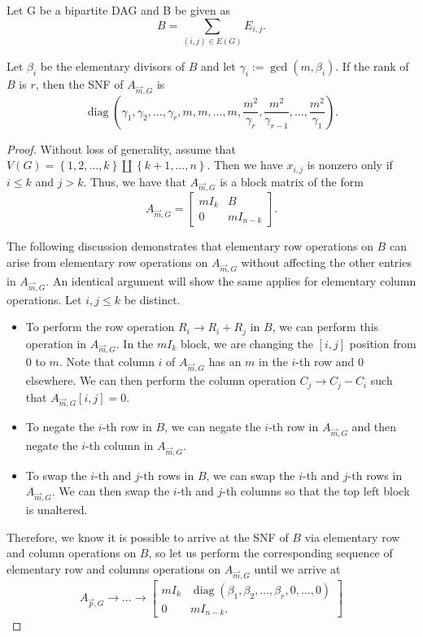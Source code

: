 \documentclass[10pt,a4paper]{amsart}
\DeclareMathOperator{\diag}{diag}
\newcommand\set[1]{\left\{#1\right\}}
\begin{document}
\begin{prop}\label{thm:bipartite_elementary_divisors}
	Let G be a bipartite DAG and B be given as 
	\[
	B = \sum_{(i,j)\in E(G)} E_{i,j}. 
	\]
	
	Let $\beta_i$ be the elementary divisors of $B$ and let $\gamma_i := \gcd(m, \beta_i)$. 
	If the rank of $B$ is $r$, then the SNF of $A_{\vec{m}, G}$ is
	\[\diag\left(\gamma_1, \gamma_2, \dots, \gamma_r, m, m, \dots, m, \dfrac{m^2}{\gamma_r}, \dfrac{m^2}{\gamma_{r-1}}, \dots, \dfrac{m^2}{\gamma_{1}}\right).\]
\end{prop}

\begin{proof}
	Without loss of generality, assume that $V(G) = \set{1,2,\dots,k} \amalg \set{k+1,\dots,n}$. 
	Then we have $x_{i,j}$ is nonzero only if $i \leq k$ and $j > k$. Thus, we have that $A_{\vec{m}, G}$ is a block matrix of the form
	\[A_{\vec{m}, G} = \begin{bmatrix}
		mI_k & B \\
		0 & mI_{n-k}
	\end{bmatrix}.\]
	
	The following discussion demonstrates that elementary row operations on $B$ can arise from elementary row operations on $A_{\vec{m} ,G}$ without affecting the other entries in $A_{\vec{m} ,G}$. 
	An identical argument will show the same applies for elementary column operations. 
	Let $i,j \leq k$ be distinct.
	\begin{itemize}
		\item To perform the row operation $R_i \to R_i + R_j$ in $B$, we can perform this operation in $A_{\vec{m}, G}$. In the $mI_k$ block, we are changing the $[i,j]$ position from 0 to $m$. 
		Note that column $i$ of $A_{\vec{m}, G}$ has an $m$ in the $i$-th row and 0 elsewhere. 
		We can then perform the column operation $C_j \to C_j - C_i$ such that $A_{\vec{m}, G}[i,j] = 0$. 
		\item To negate the $i$-th row in $B$, we can negate the $i$-th row in $A_{\vec{m}, G}$ and then negate the $i$-th column in $A_{\vec{m}, G}$.
		\item To swap the $i$-th and $j$-th rows in $B$, we can swap the $i$-th and $j$-th rows in $A_{\vec{m}, G}$. We can then swap the $i$-th and $j$-th columns so that the top left block is unaltered.
	\end{itemize}
	
	Therefore, we know it is possible to arrive at the SNF of $B$ via elementary row and column operations on $B$, so let us perform the corresponding sequence of elementary row and columns operations on $A_{\vec{m}, G}$ until we arrive at 
	\[A_{\vec{p}, G} \to \dots \to \begin{bmatrix}
		mI_k & \diag(\beta_1,\beta_2, \dots, \beta_r, 0, \dots, 0) \\
		0 & mI_{n-k}.
	\end{bmatrix}\]
	

\end{proof}
\end{document}

